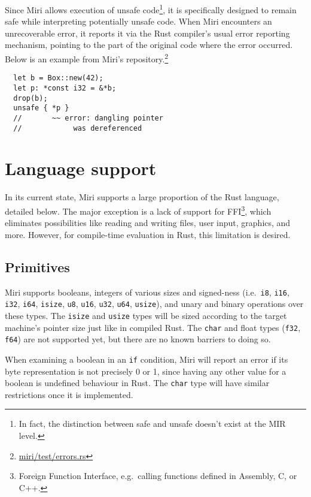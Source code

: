 \documentclass[twocolumn]{article}
\newcommand{\rust}[1]{\texttt{#1}}
\begin{document}
Since Miri allows execution of unsafe code\footnote{In fact, the distinction between safe and unsafe
doesn't exist at the MIR level.}, it is specifically designed to remain safe while interpreting
potentially unsafe code. When Miri encounters an unrecoverable error, it reports it via the Rust
compiler's usual error reporting mechanism, pointing to the part of the original code where the
error occurred. Below is an example from Miri's
repository.\footnote{\href{https://github.com/solson/miri/blob/master/test/errors.rs}{miri/test/errors.rs}}

\begin{verbatim}
  let b = Box::new(42);
  let p: *const i32 = &*b;
  drop(b);
  unsafe { *p }
  //       ~~ error: dangling pointer
  //            was dereferenced
\end{verbatim}
\label{dangling-pointer}


\section{Language support}

In its current state, Miri supports a large proportion of the Rust language, detailed below. The
major exception is a lack of support for  FFI\footnote{Foreign Function Interface, e.g.\ calling
functions defined in Assembly, C, or C++.}, which eliminates possibilities like reading and writing
files, user input, graphics, and more. However, for compile-time evaluation in Rust, this limitation
is desired.

\subsection{Primitives}

Miri supports booleans, integers of various sizes and signed-ness (i.e.\ \rust{i8}, \rust{i16},
\rust{i32}, \rust{i64}, \rust{isize}, \rust{u8}, \rust{u16}, \rust{u32}, \rust{u64}, \rust{usize}),
and unary and binary operations over these types. The \rust{isize} and \rust{usize} types will be
sized according to the target machine's pointer size just like in compiled Rust. The \rust{char} and
float types (\rust{f32}, \rust{f64}) are not supported yet, but there are no known barriers to doing
so.

When examining a boolean in an \rust{if} condition, Miri will report an error if its byte
representation is not precisely 0 or 1, since having any other value for a boolean is undefined
behaviour in Rust. The \rust{char} type will have similar restrictions once it is implemented.
\end{document}
